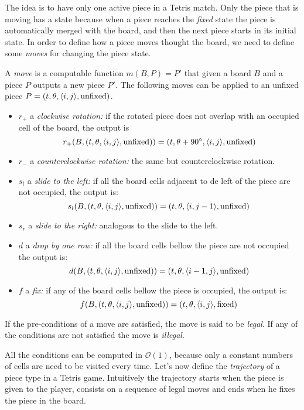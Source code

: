 The idea is to have only one active piece in a Tetris match. Only the piece that is moving has a state because when a piece reaches the \emph{fixed} state the piece is automatically merged with the board, and then the next piece starts in its initial state. In order to define how a piece moves thought the board, we need to define some \emph{moves} for changing the piece state.

\begin{definition}
  A \emph{move} is a computable function $m(B, P) = P'$ that given a board $B$ and a piece $P$ outputs a new piece $P'$. The following moves can be applied to an unfixed piece $P = \piece[t][\theta][i][j][\text{unfixed}]$. 
  \begin{itemize}
    \item $r_+$ a \emph{clockwise rotation:} if the rotated piece does not overlap with an occupied cell of the board, the output is 
      $$r_+ (B, \piece[t][\theta][i][j][\text{unfixed}]) = \piece[t][\theta + 90^\circ][i][j][\text{unfixed}]$$

    \item $r_-$ a \emph{counterclockwise rotation:} the same but counterclockwise rotation. 

    \item $s_l$ a \emph{slide to the left:} if all the board cells adjacent to de left of the piece are not occupied, the output is:
      $$s_l (B, \piece[t][\theta][i][j][\text{unfixed}]) = \piece[t][\theta][i][j-1][\text{unfixed}]$$
    \item $s_r$ a \emph{slide to the right:} analogous to the slide to the left.

    \item $d$ a \emph{drop by one row:} if all the board cells bellow the piece are not occupied the output is:
      $$d (B, \piece[t][\theta][i][j][\text{unfixed}]) = \piece[t][\theta][i-1][j][\text{unfixed}]$$

    \item $f$ a \emph{fix:} if any of the board cells bellow the piece is occupied, the output is:
      $$f (B, \piece[t][\theta][i][j][\text{unfixed}]) = \piece[t][\theta][i][j][\text{fixed}]$$
  \end{itemize}
  If the pre-conditions of a move are satisfied, the move is said to be \emph{legal}. If any of the conditions are not satisfied the move is \emph{illegal}.
\end{definition}

All the conditions can be computed in $\mathcal{O}(1)$, because only a constant numbers of cells are need to be visited every time. Let's now define the \emph{trajectory} of a piece type in a Tetris game. Intuitively the trajectory starts when the piece is given to the player, consists on a sequence of legal moves and ends when he fixes the piece in the board. 


